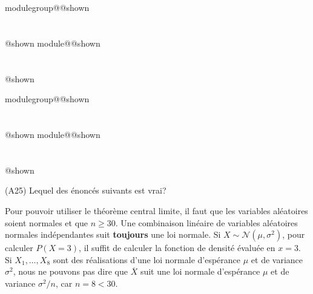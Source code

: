 \documentclass{Evaluation}
\makeatletter
\newcommand{\currentmodulekey}{}
\newcommand{\currentmoduletitle}{}
\newcommand{\currentgroupkey}{}
\newcommand{\currentgrouptitle}{}
\newcommand{\showmoduleifneeded}{%
  \ifx\currentgroupkey\empty\else
    \expandafter\ifx\csname modulegroup@\currentgroupkey @shown\endcsname\relax
      \section*{\currentgrouptitle}%
      \expandafter\gdef\csname modulegroup@\currentgroupkey @shown\endcsname{1}%
    \fi
  \fi
  \expandafter\ifx\csname module@\currentmodulekey @shown\endcsname\relax
    \section*{\currentmoduletitle}%
    \expandafter\gdef\csname module@\currentmodulekey @shown\endcsname{1}%
  \fi
}
\newenvironment{A24}{\showmoduleifneeded}{}
\newenvironment{A25}{\showmoduleifneeded}{}
\makeatother
\begin{document}
\begin{questions}
\begin{A24}
\end{A24}

\begin{A25}
\question (A25) Lequel des énoncés suivants est vrai?

\begin{checkboxes}
    \choice Pour pouvoir utiliser le théorème central limite, il faut que les variables aléatoires soient normales et que $n\geq 30$.
    \correctchoice Une combinaison linéaire de variables aléatoires normales indépendantes suit \textbf{toujours} une loi normale.
    \choice Si $X\sim\mathcal{N}(\mu,\sigma^2)$, pour calculer $P(X=3)$, il suffit de calculer la fonction de densité évaluée en $x=3$.
    \choice Si $X_1,\hdots,X_8$ sont des réalisations d'une loi normale d'espérance $\mu$ et de variance $\sigma^2$, nous ne pouvons pas dire que $\overline{X}$ suit une loi normale d'espérance $\mu$ et de variance $\sigma^2/n$, car $n=8<30$.
\end{checkboxes}


\end{A25}
\end{questions}
\end{document}
